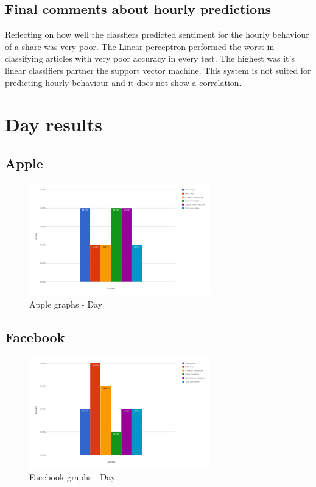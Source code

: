\documentclass[a4paper,11pt]{report}
\begin{document}
\subsection{Final comments about hourly predictions}
Reflecting on how well the classfiers predicted sentiment for the hourly behaviour of a share was very poor. The Linear perceptron performed the worst in classifying articles with very poor accuracy in every test. The highest was it's linear classifiers partner the support vector machine. This system is not suited for predicting hourly behaviour and it does not show a correlation.


\section {Day results}

\subsection{Apple}
\begin{figure}[h!]
  \centering
  	\includegraphics[width=0.70\textwidth]{apple-day.png}
  \caption{Apple graphs - Day}
\end{figure}

\subsection{Facebook}
\begin{figure}[h!]
  \centering
  	\includegraphics[width=0.70\textwidth]{facebook-day.png}
  \caption{Facebook graphs - Day}
\end{figure}
\end{document}
